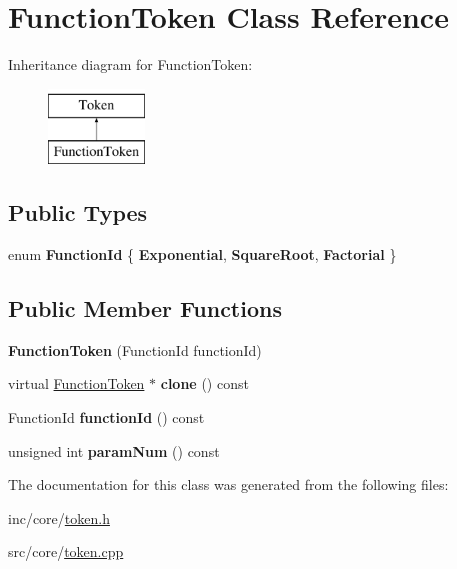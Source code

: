 \hypertarget{classFunctionToken}{\section{Function\-Token Class Reference}
\label{classFunctionToken}
}
Inheritance diagram for Function\-Token\-:\begin{figure}[H]
\begin{center}
\leavevmode
\includegraphics[height=2.000000cm]{classFunctionToken}
\end{center}
\end{figure}
\subsection*{Public Types}
\begin{DoxyCompactItemize}
\item 
enum {\bfseries Function\-Id} \{ {\bfseries Exponential}, 
{\bfseries Square\-Root}, 
{\bfseries Factorial}
 \}
\end{DoxyCompactItemize}
\subsection*{Public Member Functions}
\begin{DoxyCompactItemize}
\item 
\hypertarget{classFunctionToken_a5ee4a06cd8e2a8a7e5edaacd584a4c35}{{\bfseries Function\-Token} (Function\-Id function\-Id)}\label{classFunctionToken_a5ee4a06cd8e2a8a7e5edaacd584a4c35}

\item 
\hypertarget{classFunctionToken_abc4e12e95528a717d397e9e2fff1d67f}{virtual \hyperlink{classFunctionToken}{Function\-Token} $\ast$ {\bfseries clone} () const }\label{classFunctionToken_abc4e12e95528a717d397e9e2fff1d67f}

\item 
\hypertarget{classFunctionToken_ad34c535630da433a40dd68388e610aee}{Function\-Id {\bfseries function\-Id} () const }\label{classFunctionToken_ad34c535630da433a40dd68388e610aee}

\item 
\hypertarget{classFunctionToken_a43b402da5b91e0aaca01a99e4a2543c3}{unsigned int {\bfseries param\-Num} () const }\label{classFunctionToken_a43b402da5b91e0aaca01a99e4a2543c3}

\end{DoxyCompactItemize}


The documentation for this class was generated from the following files\-:\begin{DoxyCompactItemize}
\item 
inc/core/\hyperlink{token_8h}{token.\-h}\item 
src/core/\hyperlink{token_8cpp}{token.\-cpp}\end{DoxyCompactItemize}
